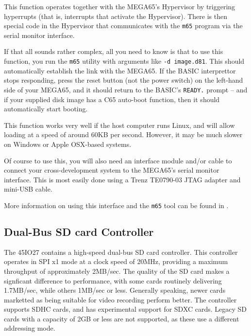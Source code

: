 This function operates together with the MEGA65's Hypervisor by
triggering hyperrupts (that is, interrupts that activate the
Hypervisor).  There is then special code in the Hypervisor that
communicates with the {\tt m65} program via the serial monitor
interface.

If that all sounds rather complex, all you need to know is that to use
this function, you run the {\tt m65} utility with arguments like
{\tt -d image.d81}.  This should automatically establish the link with
the MEGA65.  If the BASIC interprettor stops responding, press the
reset button (not the power switch) on the left-hand side of your MEGA65,
and it should return to the BASIC's {\tt READY.} prompt -- and if your
supplied disk image has a C65 auto-boot function, then it should
automatically start booting.

This function works very well if the host computer runs Linux, and
will allow loading at a speed of around 60KB per second.  However, it
may be much slower on Windows or Apple OSX-based systems.

Of course to use this, you will also need an interface module and/or
cable to connect your cross-development system to the MEGA65's serial
monitor interface. This is most easily done using a Trenz TE0790-03
JTAG adapter and mini-USB cable.

More information on using this interface and the {\tt m65} tool can be
found in .

\subsection{Dual-Bus SD card Controller}

The 45IO27 contains a high-speed dual-bus SD card controller.  This
controller operates in SPI x1 mode at a clock speed of 20MHz,
providing a maximum throughput of approximately 2MB/sec.  The quality
of the SD card makes a signficant difference to performance, with some
cards routinely delivering 1.7MB/sec, while others 1MB/sec or
less. Generally speaking, newer cards marketted as being suitable for
video recording perform better.  The controller supports SDHC cards,
and has experimental support for SDXC cards.  Legacy SD cards with a
capacity of 2GB or less are not supported, as these use a different
addressing mode.


